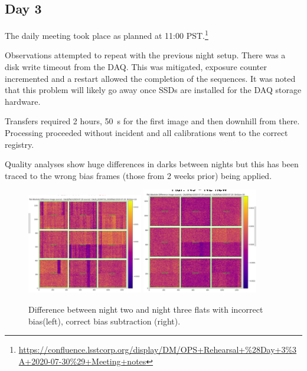 \subsection{Day 3} \label{sec:day3}

The daily meeting took place as planned at 11:00 PST.\footnote{\url{https://confluence.lsstcorp.org/display/DM/OPS+Rehearsal+\%28Day+3\%3A+2020-07-30\%29+Meeting+notes}}

Observations attempted to repeat with the previous night setup.  There was a
disk write timeout from the DAQ.  This was mitigated, exposure counter incremented
and a restart allowed the completion of the sequences.  It was noted that this
problem will likely go away once SSDs are installed for the DAQ storage hardware.

Transfers required 2 hours, 50~s for the first image and then downhill from there.
Processing proceeded without incident and all calibrations went to the correct
registry.

Quality analyses show huge differences in darks between nights but this has been
traced to the wrong bias frames (those from 2 weeks prior) being applied.


\begin{figure}
\includegraphics[width=0.45\textwidth]{figures/n3-2bad}
\includegraphics[width=0.45\textwidth]{figures/n3-2}
	\caption{Difference between night two and night three flats with incorrect bias(left),  correct bias subtraction (right).\label{fig:d3}}
\end{figure}


